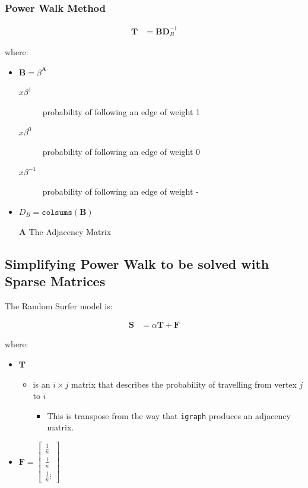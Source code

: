 \documentclass[11pt]{article}
\begin{document}
\subsubsection{Power Walk Method}
\label{sec:org10ef330}

\begin{align}
\mathbf{T} &= \mathbf{B} \mathbf{D}^{-1}_{B} \label{eq:pwalk-def}
\end{align}



where:

\begin{itemize}
\item \(\mathbf{B}= \beta^{\mathbf{A}}\)
\begin{description}
\item[{\(x\beta^{1}\) }] probability of following an edge of weight 1
\item[{\(x\beta^{0}\) }] probability of following an edge of weight 0
\item[{\(x\beta^{-1}\)}] probability of following an edge of weight -
\end{description}
\item \(D_{B} = \mathtt{colsums}(\mathbf{B})\)
\item[{\(\mathbf{A}\)}] The Adjacency Matrix
\end{itemize}



\subsection{Simplifying Power Walk to be solved with Sparse Matrices}
\label{sec:org6cfae3c}
The Random Surfer model is:

$$\begin{aligned}
    \mathbf{S} &= \alpha \mathbf{T} +  \mathbf{F}  \label{eq:sparse-RS}\end{aligned}$$

where:

\begin{itemize}
\item \(\mathbf{T}\)

\begin{itemize}
\item is an \(i \times j\) matrix that describes the probability of
travelling from vertex \(j\) to \(i\)

\begin{itemize}
\item This is transpose from the way that \texttt{igraph} produces an adjacency
matrix.
\end{itemize}
\end{itemize}

\item \(\mathbf{F} = \begin{bmatrix} \frac{1}{n} \\ \frac{1}{n} \\ \frac{1}{n} \vdots \end{bmatrix}\)
\end{itemize}
\end{document}
